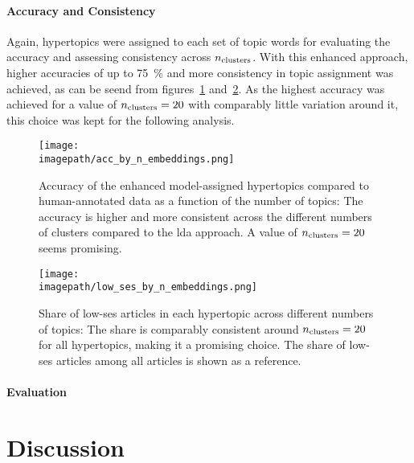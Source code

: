 \paragraph{Accuracy and Consistency}
Again, hypertopics were assigned to each set of topic words for evaluating the accuracy and assessing consistency across $n_\text{clusters}$. With this enhanced approach, higher accuracies of up to \SI{75}{\percent} and more consistency in topic assignment was achieved, as can be seend from figures~\ref{fig:accuracy_by_nclusters} and~\ref{fig:lowshare_by_nclusters}. As the highest accuracy was achieved for a value of $n_\text{clusters}=20$ with comparably little variation around it, this choice was kept for the following analysis. 

\begin{figure}
    \centering
    \texttt{[image: \\imagepath/acc\_by\_n\_embeddings.png]}
    \caption{Accuracy of the  enhanced model-assigned hypertopics compared to human-annotated data as a function of the number of topics: The accuracy is higher and more consistent across the different numbers of clusters compared to the \gls{lda} approach. A value of $n_\text{clusters}=20$ seems promising.}\label{fig:accuracy_by_nclusters}
\end{figure}

\begin{figure}
    \centering
    \texttt{[image: \\imagepath/low\_ses\_by\_n\_embeddings.png]}
    \caption{Share of low-\gls{ses} articles in each hypertopic across different numbers of topics: The share is comparably consistent around $n_\text{clusters}=20$ for all hypertopics, making it a promising choice. The share of low-\gls{ses} articles among all articles is shown as a reference.}\label{fig:lowshare_by_nclusters}
\end{figure}

\paragraph{Evaluation}


\section{Discussion}